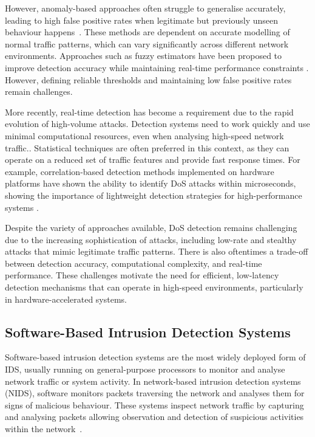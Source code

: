 However, anomaly-based approaches often struggle to generalise accurately, leading to high false positive rates when legitimate but previously unseen behaviour happens~\cite{noauthor_usenix_nodate}. These methods are dependent on accurate modelling of normal traffic patterns, which can vary significantly across different network environments. Approaches such as fuzzy estimators have been proposed to improve detection accuracy while maintaining real-time performance constraints \cite{shiaeles_real_2012}. However, defining reliable thresholds and maintaining low false positive rates remain challenges.

More recently, real-time detection has become a requirement due to the rapid evolution of high-volume attacks. Detection systems need to work quickly and use minimal computational resources, even when analysing high-speed network traffic.. Statistical techniques are often preferred in this context, as they can operate on a reduced set of traffic features and provide fast response times. For example, correlation-based detection methods implemented on hardware platforms have shown the ability to identify DoS attacks within microseconds, showing the importance of lightweight detection strategies for high-performance systems \cite{hoque_real-time_2017}.

Despite the variety of approaches available, DoS detection remains challenging due to the increasing sophistication of attacks, including low-rate and stealthy attacks that mimic legitimate traffic patterns. There is also oftentimes a trade-off between detection accuracy, computational complexity, and real-time performance. These challenges motivate the need for efficient, low-latency detection mechanisms that can operate in high-speed environments, particularly in hardware-accelerated systems.

\subsection{Software-Based Intrusion Detection Systems}
Software-based intrusion detection systems are the most widely deployed form of IDS, usually running on general-purpose processors to monitor and analyse network traffic or system activity. In network-based intrusion detection systems (NIDS), software monitors packets traversing the network and analyses them for signs of malicious behaviour. These systems inspect network traffic by capturing and analysing packets allowing observation and detection of suspicious activities within the network~\cite{noauthor_pdf_nodate, kumar_survey_nodate}.

